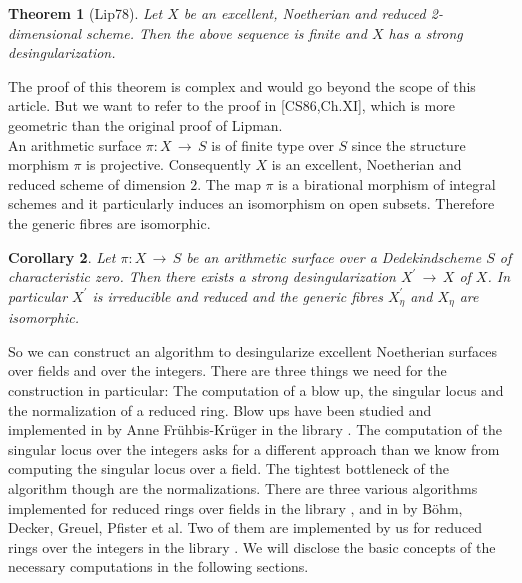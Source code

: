 \documentclass{article}
\newtheorem{thm}{Theorem}
\newtheorem{cor}[thm]{Corollary}
\begin{document}
\begin{thm}[Lip78]
Let $X$ be an excellent, Noetherian and reduced 2-dimensional scheme. Then the above
sequence is finite and $X$ has a strong desingularization.
\end{thm}

\noindent
The proof of this theorem is complex and would go beyond the scope of this article.
But we want to refer to the proof in [CS86,Ch.XI], 
which is more geometric than the original proof of Lipman.\\
An arithmetic surface $\pi:X\,\rightarrow\, S$ is of finite type over $S$ since 
the structure morphism $\pi$ is projective. Consequently $X$ is an excellent, 
Noetherian and reduced scheme of dimension $2$.
The map $\pi$ is a birational morphism of integral schemes and it particularly induces 
an isomorphism on open subsets. Therefore the generic fibres are isomorphic.\\


\begin{cor}
Let $\pi:X\,\rightarrow\, S$ be an arithmetic surface over a Dedekindscheme $S$ 
of characteristic zero. Then there exists a strong desingularization 
$X^\prime\,\rightarrow\,X$ of $X$. In particular $X^\prime$ is irreducible and 
reduced and the generic fibres $X_\eta^\prime$ and $X_\eta$ are isomorphic.
\end{cor}

\noindent
So we can construct an algorithm to desingularize excellent Noetherian surfaces 
over fields and over the integers. There are three things we need for the construction 
in particular: The computation of a blow up, the singular locus and the 
normalization of a reduced ring. Blow ups have been studied and implemented in 
{} by Anne Fr\"uhbis-Kr\"uger in the library {}. 
The computation of the singular locus over the integers asks for a different 
approach than we know from computing the singular locus over a field. The 
tightest bottleneck of the algorithm though are the normalizations. 
There are three various algorithms implemented for reduced rings over fields in 
the library {}, {} and {} 
in {} by B\"ohm, Decker, Greuel, Pfister et al.
Two of them are implemented by us for reduced rings over the integers in the 
library {}. 
We will disclose the basic concepts of the necessary computations in the 
following sections.\\
\end{document}

